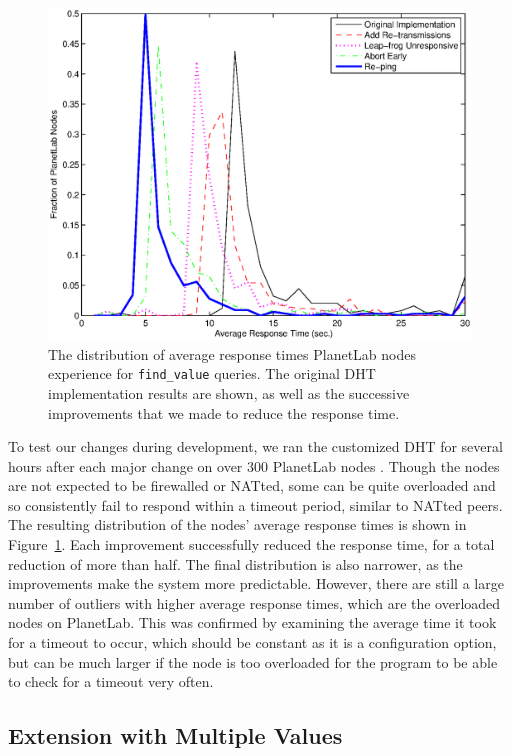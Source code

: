 \documentclass[conference]{IEEEtran}
\begin{document}
\begin{figure}
\centering
\includegraphics[width=\columnwidth]{apt_p2p_improvements-find_value.eps}
\caption{The distribution of average response times PlanetLab nodes
experience for \texttt{find\_value} queries. The original DHT
implementation results are shown, as well as the successive
improvements that we made to reduce the response time.}
\label{improvements}
\end{figure}

To test our changes during development, we ran the customized DHT
for several hours after each major change on over 300 PlanetLab nodes
\cite{planetlab}. Though the nodes are not expected to be firewalled
or NATted, some can be quite overloaded and so consistently fail to
respond within a timeout period, similar to NATted peers. The
resulting distribution of the nodes' average response times is shown
in Figure~\ref{improvements}. Each improvement successfully reduced
the response time, for a total reduction of more than half. The
final distribution is also narrower, as the improvements make the
system more predictable. However, there are still a large number of
outliers with higher average response times, which are the
overloaded nodes on PlanetLab. This was confirmed by examining the
average time it took for a timeout to occur, which should be
constant as it is a configuration option, but can be much larger if
the node is too overloaded for the program to be able to check for a
timeout very often.

\subsection{Extension with Multiple Values}
\label{multiple_values}
\end{document}
